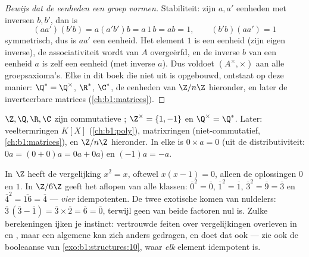 \begin{proof}[Bewijs dat de eenheden een groep vormen]
Stabiliteit: zijn $a, a'$ eenheden met inversen $b, b'$, dan is
\[
(aa')(b'b) = a(a'b')b = a\,1\,b = ab = 1,
\qquad (b'b)(aa') = 1
\]
symmetrisch, dus is $aa'$ een eenheid. Het element $1$ is een eenheid
(zijn eigen inverse), de associativiteit wordt van $A$ overgeërfd, en de
inverse $b$ van een eenheid $a$ is zelf een eenheid (met inverse $a$).
Dus voldoet $(A^\times, \times)$ aan alle groepsaxioma's. Elke  in
dit boek die niet uit  is opgebouwd, ontstaat op deze manier:
$\Q^* = \Q^\times$, $\R^*$, $\C^*$, de eenheden van $\Z/n\Z$ hieronder,
en later de inverteerbare matrices (\cref{ch:b1:matrices}).
\end{proof}

\begin{example}\label{ex:b1:structures:rings}
$\Z, \Q, \R, \C$ zijn commutatieve ; $\Z^\times = \{1, -1\}$ en
$\Q^\times = \Q^*$. Later: veeltermringen $K[X]$ (\cref{ch:b1:poly}),
matrixringen (niet-commutatief, \cref{ch:b1:matrices}), en $\Z/n\Z$
hieronder. In elke  is $0 \times a = 0$ (uit de distributiviteit: $0a
= (0+0)a = 0a + 0a$) en $(-1)a = -a$.
\end{example}

\begin{example}\label{ex:b1:structures:idempotents}
In $\Z$ heeft de vergelijking $x^2 = x$, oftewel $x(x - 1) = 0$, alleen
de oplossingen $0$ en $1$. In $\Z/6\Z$ geeft het aflopen van alle
klassen: $\overline0^2 = \overline0$, $\overline1^2 = \overline1$,
$\overline3^2 = \overline9 = \overline3$ en $\overline4^2 = \overline{16}
= \overline4$ --- \emph{vier} idempotenten. De twee exotische komen van
nuldelers: $\overline3\,(\overline3 - \overline1) = \overline3 \times
\overline2 = \overline6 = \overline0$, terwijl geen van beide factoren nul
is. Zulke berekeningen ijken je instinct: vertrouwde feiten over
vergelijkingen overleven in  en , maar een
algemene  kan zich anders gedragen, en doet dat ook --- zie ook de
booleaanse  van \cref{exo:b1:structures:10}, waar \emph{elk} element
idempotent is.
\end{example}

